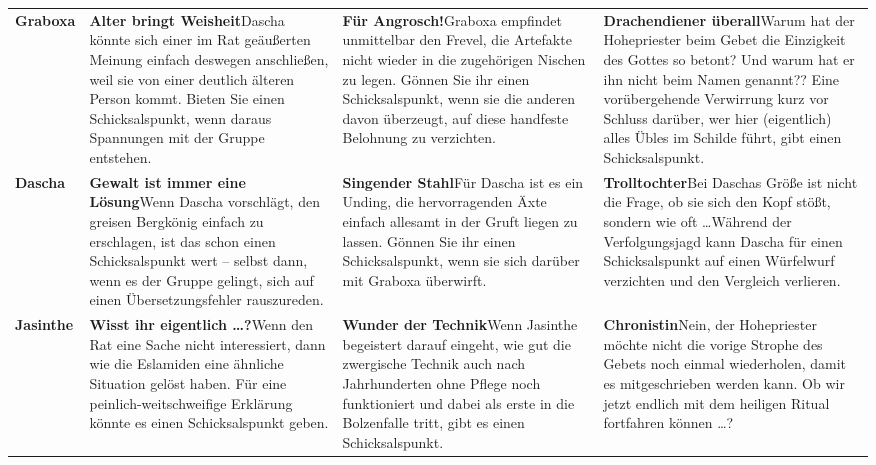\begin{tabularx}{0.98\linewidth}{l|XXX}
	&\tkopf{Der Tiefe Rat} & \tkopf{Die Finsterkopp-Binge}&\tkopf{Das Szepter}\\
	\hline
	
	\textbf{Graboxa}&\textbf{Alter bringt Weisheit}\newline Dascha könnte sich einer im Rat geäußerten Meinung einfach deswegen anschließen, weil sie von einer deutlich älteren Person kommt. Bieten Sie einen Schicksalspunkt, wenn daraus Spannungen mit der Gruppe entstehen.
	&\textbf{Für Angrosch!}\newline Graboxa empfindet unmittelbar den Frevel, die Artefakte nicht wieder in die zugehörigen Nischen zu legen. Gönnen Sie ihr einen Schicksalspunkt, wenn sie die anderen davon überzeugt, auf diese handfeste Belohnung zu verzichten.
	& \textbf{Drachendiener überall}\newline Warum hat der Hohepriester beim Gebet die Einzigkeit des Gottes so betont? Und warum hat er ihn nicht beim Namen genannt?? Eine vorübergehende Verwirrung kurz vor Schluss darüber, wer hier (eigentlich) alles Übles im Schilde führt, gibt einen Schicksalspunkt.\\
	
	\textbf{Dascha}&\textbf{Gewalt ist immer eine Lösung}\newline Wenn Dascha vorschlägt, den greisen Bergkönig einfach zu erschlagen, ist das schon einen Schicksalspunkt wert -- selbst dann, wenn es der Gruppe gelingt, sich auf einen Übersetzungsfehler rauszureden. &\textbf{Singender Stahl}\newline Für Dascha ist es ein Unding, die hervorragenden Äxte einfach allesamt in der Gruft liegen zu lassen. Gönnen Sie ihr einen Schicksalspunkt, wenn sie sich darüber mit Graboxa überwirft.&\textbf{Trolltochter}\linebreak Bei Daschas Größe ist nicht die Frage, ob sie sich den Kopf stößt, sondern wie oft \dots Während der Verfolgungsjagd kann Dascha für einen Schicksalspunkt auf einen Würfelwurf verzichten und den Vergleich verlieren.\\
	
	\textbf{Jasinthe}&\textbf{Wisst ihr eigentlich \dots ?}\newline Wenn den Rat eine Sache nicht interessiert, dann wie die Eslamiden eine ähnliche Situation gelöst haben. Für eine peinlich-weitschweifige Erklärung könnte es einen Schicksalspunkt geben.&\textbf{Wunder der Technik}\newline Wenn Jasinthe begeistert darauf eingeht, wie gut die zwergische Technik auch nach Jahrhunderten ohne Pflege noch funktioniert und dabei als erste in die Bolzenfalle tritt, gibt es einen Schicksalspunkt.&\textbf{Chronistin}\newline Nein, der Hohepriester möchte nicht die vorige Strophe des Gebets noch einmal wiederholen, damit es mitgeschrieben werden kann. Ob wir jetzt endlich mit dem heiligen Ritual fortfahren können \dots?\\
	

\end{tabularx}
